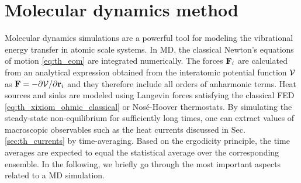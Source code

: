 


\section{Molecular dynamics method}

\label{sec:methods_md}


Molecular dynamics simulations are a powerful tool for modeling the vibrational energy transfer in atomic scale systems. In MD, the classical Newton's equations of motion \eqref{eq:th_eom}  are integrated numerically. The forces $\mathbf{F}_i$ are calculated from an analytical expression obtained from the interatomic potential function $\mathcal{V}$ as $\mathbf{F}=-\partial \mathcal{V}/\partial \mathbf{r}_i$ and they therefore include all orders of anharmonic terms. Heat sources and sinks are modeled using Langevin forces satisfying the classical FED \eqref{eq:th_xixiom_ohmic_classical} or Nos\'e-Hoover \cite{nose84} thermostats. By simulating the steady-state non-equilibrium for sufficiently long times, one can extract values of macroscopic observables such as the heat currents discussed in Sec. \ref{sec:th_currents} by time-averaging. Based on the ergodicity principle, the time averages are expected to equal the statistical average over the corresponding ensemble. In the following, we briefly go through the most important aspects related to a MD simulation.

